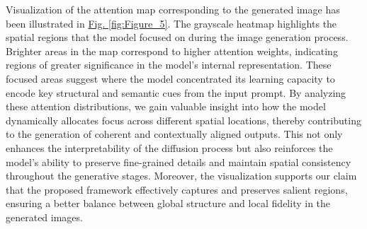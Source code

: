 \documentclass[a4paper,fleqn]{ieeetj}
\begin{document}


Visualization of the attention map corresponding to the generated image has been illustrated in \hyperref[fig:Figure_5]{Fig. \ref*{fig:Figure_5}}. The grayscale heatmap highlights the spatial regions that the model focused on during the image generation process. Brighter areas in the map correspond to higher attention weights, indicating regions of greater significance in the model’s internal representation. These focused areas suggest where the model concentrated its learning capacity to encode key structural and semantic cues from the input prompt. By analyzing these attention distributions, we gain valuable insight into how the model dynamically allocates focus across different spatial locations, thereby contributing to the generation of coherent and contextually aligned outputs. This not only enhances the interpretability of the diffusion process but also reinforces the model's ability to preserve fine-grained details and maintain spatial consistency throughout the generative stages. Moreover, the visualization supports our claim that the proposed framework effectively captures and preserves salient regions, ensuring a better balance between global structure and local fidelity in the generated images.
\end{document}
